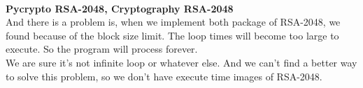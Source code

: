 \documentclass{article}
\begin{document}
\noindent  \\

{\bf Pycrypto RSA-2048, Cryptography RSA-2048}\\

And there is a problem is, when we implement both package of RSA-2048, we found because of the block size limit. The loop times will become too large to execute. So the program will process forever.\\
We are sure it's not infinite loop or whatever else. And we can't find a better way to solve this problem, so we don't have execute time images of RSA-2048.
\end{document}
